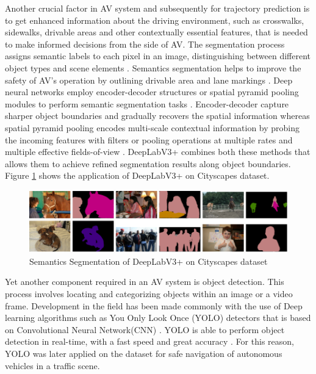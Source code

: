 \tab Another crucial factor in AV system and subsequently for trajectory prediction is to get enhanced information about the driving environment, such as crosswalks, sidewalks, drivable areas and other contextually essential features, that is needed to make informed decisions from the side of AV.  The segmentation process assigns semantic labels to each pixel in an image, distinguishing between different object types and scene elements \cite{sun2024semanticformerholisticsemantictraffic}. Semantics segmentation helps to improve the safety of AV's operation by outlining drivable area and lane markings \cite{che2024twinlitenetplusstrongermodelrealtime}. Deep neural networks employ encoder-decoder structures or spatial pyramid pooling modules to perform semantic segmentation tasks \cite{DBLP:journals/corr/abs-1802-02611}. Encoder-decoder capture sharper object boundaries and gradually recovers the spatial information whereas spatial pyramid pooling encodes multi-scale contextual information by probing the incoming features with filters or pooling operations at multiple rates and multiple effective fields-of-view \cite{DBLP:journals/corr/abs-1802-02611}. DeepLabV3+ \cite{DBLP:journals/corr/abs-1802-02611} combines both these methods that allows them to achieve refined segmentation results along object boundaries. Figure \ref{fig:deeplab} shows the application of DeepLabV3+ on Cityscapes dataset.


\begin{figure}[h]
  \begin{center}
     \includegraphics[scale=0.5]{Images/Figures/deeplabv3+.png}
  \end{center}
  \caption{Semantics Segmentation of DeepLabV3+ on Cityscapes dataset}
  \label{fig:deeplab}
\end{figure}

\tab Yet another component required in an AV system is object detection. This process involves locating and categorizing objects \cite{silva2024recurrentyolov8basedframeworkeventbased} within an image or a video frame. Development in the field has been made commonly with the use of Deep learning algorithms such as You Only Look Once (YOLO) detectors that is based on Convolutional Neural Network(CNN) \cite{silva2024recurrentyolov8basedframeworkeventbased}. YOLO is able to perform object detection in real-time, with a fast speed and great accuracy \cite{yolov3}. For this reason, YOLO was later applied on the dataset for safe navigation of autonomous vehicles in a traffic scene.

